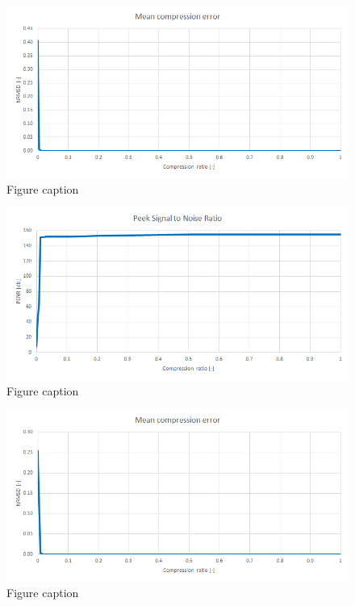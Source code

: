 \begin{figure}[ht]
\centering\includegraphics[width=\textwidth]{figures/mechaxisym_NRMSD}
\caption{Figure caption}
\end{figure}

\begin{figure}[ht]
\centering\includegraphics[width=\textwidth]{figures/mechaxisym_PSNR}
\caption{Figure caption}
\end{figure}

\begin{figure}[ht]
\centering\includegraphics[width=\textwidth]{figures/temelin_NRMSD}
\caption{Figure caption}
\end{figure}

